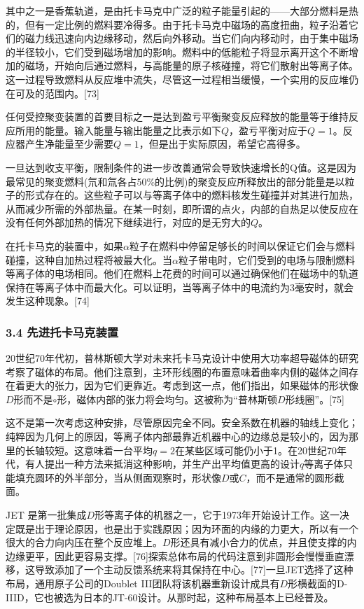 其中之一是香蕉轨道，是由托卡马克中广泛的粒子能量引起的——大部分燃料是热的，但有一定比例的燃料要冷得多。由于托卡马克中磁场的高度扭曲，粒子沿着它们的磁力线迅速向内边缘移动，然后向外移动。当它们向内移动时，由于集中磁场的半径较小，它们受到磁场增加的影响。燃料中的低能粒子将显示离开这个不断增加的磁场，开始向后通过燃料，与高能量的原子核碰撞，将它们散射出等离子体。这一过程导致燃料从反应堆中流失，尽管这一过程相当缓慢，一个实用的反应堆仍在可及的范围内。[73]

任何受控聚变装置的首要目标之一是达到盈亏平衡聚变反应释放的能量等于维持反应所用的能量。输入能量与输出能量之比表示如下$Q$，盈亏平衡对应于$Q=1$。反应器产生净能量至少需要$Q=1$，但是出于实际原因，希望它高得多。

一旦达到收支平衡，限制条件的进一步改善通常会导致快速增长的Q值。这是因为最常见的聚变燃料(氘和氚各占50\%的比例)的聚变反应所释放出的部分能量是以粒子的形式存在的。这些粒子可以与等离子体中的燃料核发生碰撞并对其进行加热，从而减少所需的外部热量。在某一时刻，即所谓的点火，内部的自热足以使反应在没有任何外部加热的情况下继续进行，对应的是无穷大的$Q$。

在托卡马克的装置中，如果$\alpha$粒子在燃料中停留足够长的时间以保证它们会与燃料碰撞，这种自加热过程将被最大化。当$\alpha$粒子带电时，它们受到的电场与限制燃料等离子体的电场相同。他们在燃料上花费的时间可以通过确保他们在磁场中的轨道保持在等离子体中而最大化。可以证明，当等离子体中的电流约为3毫安时，就会发生这种现象。[74]
\subsubsection{3.4 先进托卡马克装置}
20世纪70年代初，普林斯顿大学对未来托卡马克设计中使用大功率超导磁体的研究考察了磁体的布局。他们注意到，主环形线圈的布置意味着曲率内侧的磁体之间存在着更大的张力，因为它们更靠近。考虑到这一点，他们指出，如果磁体的形状像$D$形而不是$\circ$形，磁体内部的张力将会均匀。这被称为“普林斯顿$D$形线圈”。[75]

这不是第一次考虑这种安排，尽管原因完全不同。安全系数在机器的轴线上变化；纯粹因为几何上的原因，等离子体内部最靠近机器中心的边缘总是较小的，因为那里的长轴较短。这意味着一台平均$q= 2$在某些区域可能仍小于1。在20世纪70年代，有人提出一种方法来抵消这种影响，并生产出平均值更高的设计$q$等离子体只能填充圆环的外半部分，当从侧面观察时，形状像$D$或$C$，而不是通常的圆形截面。

JET 是第一批集成$D$形等离子体的机器之一，它于1973年开始设计工作。这一决定既是出于理论原因，也是出于实践原因；因为环面的内缘的力更大，所以有一个很大的合力向内压在整个反应堆上。$D$形还具有减小合力的优点，并且使支撑的内边缘更平，因此更容易支撑。[76]探索总体布局的代码注意到非圆形会慢慢垂直漂移，这导致添加了一个主动反馈系统来将其保持在中心。[77]一旦JET选择了这种布局，通用原子公司的Doublet III团队将该机器重新设计成具有$D$形横截面的D-IIID，它也被选为日本的JT-60设计。从那时起，这种布局基本上已经普及。

